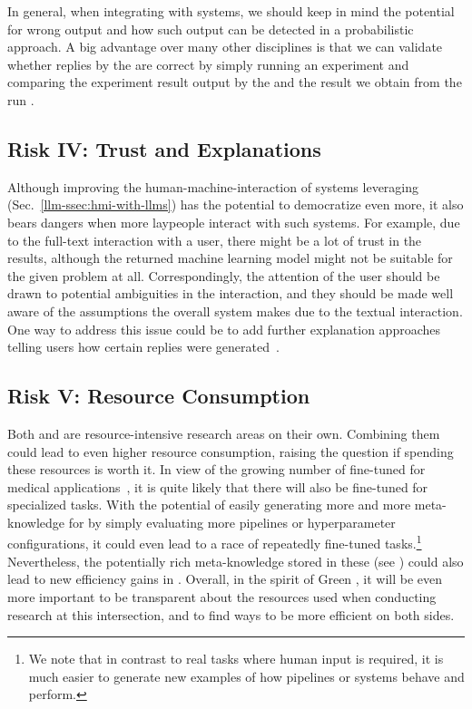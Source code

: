In general, when integrating \LLMs with \AutoML systems, we should keep in mind the potential for wrong \LLM output and how such output can be detected in a probabilistic approach. A big advantage over many other disciplines is that we can validate whether replies by the \LLM are correct by simply running an experiment and comparing the experiment result output by the \LLM and the result we obtain from the run \cite{zheng2023gpt4,chen2023evoprompting,hollmann2023gpt}.

\subsection{Risk IV: Trust and Explanations}
Although improving the human-machine-interaction of \AutoML systems leveraging \LLMs (Sec.~\ref{llm-ssec:hmi-with-llms}) has the potential to democratize \ML even more, it also bears dangers when more laypeople interact with such systems. For example, due to the full-text interaction with a user, there might be a lot of trust in the results, although the returned machine learning model might not be suitable for the given problem at all. Correspondingly, the attention of the user should be drawn to potential ambiguities in the interaction, and they should be made well aware of the assumptions the overall system makes due to the textual interaction. One way to address this issue could be to add further explanation approaches telling users how certain replies were generated~\cite{deb-arxiv23a}. 

\subsection{Risk V: Resource Consumption} 
Both \LLMs and \AutoML are resource-intensive research areas on their own. Combining them could lead to even higher resource consumption, raising the question if spending these resources is worth it. In view of the growing number of fine-tuned \LLMs for medical applications~\cite{han-arxiv23a,wu-arxiv23b}, it is quite likely that there will also be fine-tuned \LLMs for specialized \AutoML tasks. With the potential of easily generating more and more meta-knowledge for \AutoML by simply evaluating more \ML pipelines or hyperparameter configurations, it could even lead to a race of repeatedly fine-tuned tasks.\footnote{We note that in contrast to real \NLP tasks where human input is required, it is much easier to generate new examples of how \ML pipelines or \AutoML systems behave and perform.} Nevertheless, the potentially rich meta-knowledge stored in these \LLMs (see ) could also lead to new efficiency gains in \AutoML. Overall, in the spirit of Green \AutoML \cite{tornede-jair23a}, it will be even more important to be transparent about the resources used when conducting research at this intersection, and to find ways to be more efficient on both sides.

